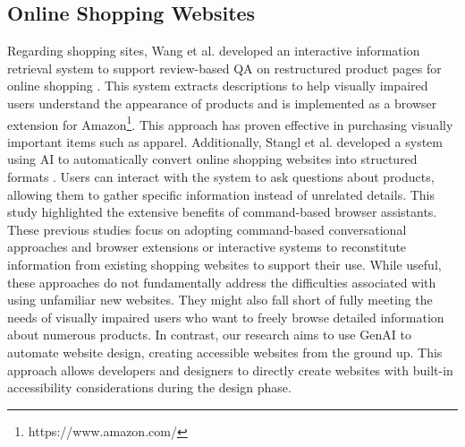 \subsection{\textbf{Online Shopping Websites}}
Regarding shopping sites, Wang et al. developed an interactive information retrieval system to support review-based QA on restructured product pages for online shopping \cite{10.1145/3411764.3445547}. This system extracts descriptions to help visually impaired users understand the appearance of products and is implemented as a browser extension for Amazon\footnote{https://www.amazon.com/}. This approach has proven effective in purchasing visually important items such as apparel. Additionally, Stangl et al. developed a system using AI to automatically convert online shopping websites into structured formats \cite{10.1145/3234695.3236337}. Users can interact with the system to ask questions about products, allowing them to gather specific information instead of unrelated details. This study highlighted the extensive benefits of command-based browser assistants. These previous studies focus on adopting command-based conversational approaches and browser extensions or interactive systems to reconstitute information from existing shopping websites to support their use. While useful, these approaches do not fundamentally address the difficulties associated with using unfamiliar new websites. They might also fall short of fully meeting the needs of visually impaired users who want to freely browse detailed information about numerous products. In contrast, our research aims to use GenAI to automate website design, creating accessible websites from the ground up. This approach allows developers and designers to directly create websites with built-in accessibility considerations during the design phase.

